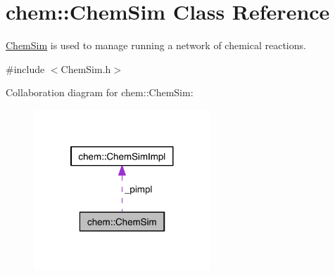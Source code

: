 \hypertarget{classchem_1_1ChemSim}{\section{chem\-:\-:Chem\-Sim Class Reference}
\label{classchem_1_1ChemSim}
}


\hyperlink{classchem_1_1ChemSim}{Chem\-Sim} is used to manage running a network of chemical reactions.  




{\ttfamily \#include $<$Chem\-Sim.\-h$>$}



Collaboration diagram for chem\-:\-:Chem\-Sim\-:\nopagebreak
\begin{figure}[H]
\begin{center}
\leavevmode
\includegraphics[width=188pt]{classchem_1_1ChemSim__coll__graph}
\end{center}
\end{figure}
